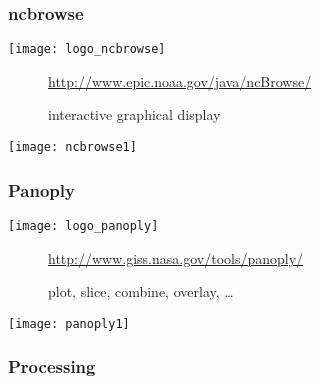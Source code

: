 \begin{frame}[c]
\frametitle{ncbrowse}

\texttt{[image: logo\_ncbrowse]}

\begin{description}
\item[\homepage] {\scriptsize \url{http://www.epic.noaa.gov/java/ncBrowse/}}
\item[\tool] interactive graphical display
\end{description}

\vfill

\texttt{[image: ncbrowse1]}
\end{frame}

\begin{frame}[c]
\frametitle{Panoply}

\texttt{[image: logo\_panoply]}

\begin{description}
\item[\homepage] {\scriptsize\url{http://www.giss.nasa.gov/tools/panoply/}}
\item[\tool] plot, slice, combine, overlay, \ldots
\end{description}

\vfill

\texttt{[image: panoply1]}

\end{frame}

\subsubsection{Processing}

